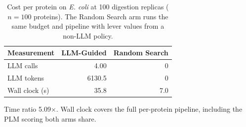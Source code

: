 \begin{table}[!t]
  \centering
  \caption{Cost per protein on \textit{E. coli} at 100 digestion replicas ($n=100$ proteins). The Random Search arm runs the same budget and pipeline with lever values from a non-LLM policy.}
  \label{tab:cost}
  \begin{tabular}{lrr}
    \toprule
    Measurement & LLM-Guided & Random Search \\
    \midrule
    LLM calls & 4.00 & 0 \\
    LLM tokens & 6130.5 & 0 \\
    Wall clock (s) & 35.8 & 7.0 \\
    \bottomrule
  \end{tabular}
  \par\smallskip\footnotesize{Time ratio 5.09$\times$. Wall clock covers the full per-protein pipeline, including the PLM scoring both arms share.}
\end{table}
